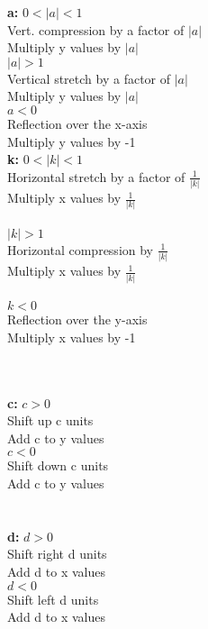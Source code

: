 \documentclass{article}
\begin{document}
    \begin{multicols}{2}

    \noindent
    \textbf{a:} $ 0 < |a| < 1 $\\
    \noindent
    Vert. compression by a factor of $|a|$\\
    Multiply y values by $|a|$\\

    \noindent
    $|a| > 1$\\
    Vertical stretch by a factor of $|a|$\\
    Multiply y values by $|a|$\\

    \noindent
    $a < 0$\\
    Reflection over the x-axis\\
    Multiply y values by -1\\

    \columnbreak
    \noindent
    \textbf{k:} $ 0 < |k| < 1 $\\
    \noindent
    Horizontal stretch by a factor of $\frac{1}{|k|}$\\
    Multiply x values by $\frac{1}{|k|}$\\\\
    $|k| > 1$\\
    \noindent
    Horizontal compression by $\frac{1}{|k|}$\\
    Multiply x values by $\frac{1}{|k|}$\\\\
    $k<0$\\
    \noindent
    Reflection over the y-axis\\
    Multiply x values by -1

    \end{multicols}

    \begin{multicols}{2}
    \noindent \\\\
    \textbf{c:} $ c > 0 $ \\
    \noindent
    Shift up c units\\
    Add c to y values\\

    \noindent
    $c < 0$ \\
    Shift down c units\\
    Add c to y values\\

    \columnbreak
    \noindent  \\\\
    \textbf{d:} $d > 0$\\
    \noindent
    Shift right d units\\
    Add d to x values\\

    \noindent
    $d < 0$\\
    Shift left d units\\
    Add d to x values \\

    \end{multicols}
\end{document}
